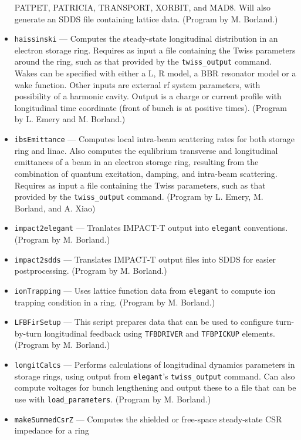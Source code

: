 \documentclass[11pt]{article}
\begin{document}
\begin{itemize}
        PATPET, PATRICIA, TRANSPORT, XORBIT, and MAD8.  Will also generate an SDDS file containing lattice
        data.  (Program by M. Borland.)
\item {\tt haissinski} --- Computes the steady-state longitudinal distribution in
        an electron storage ring.  Requires as input a file containing the Twiss
        parameters around the ring, such as that provided by the \verb|twiss_output| command.
        Wakes can be specified with either a L, R model, a BBR resonator model or a wake function.
        Other inputs are external rf system parameters, with possibility of a harmonic
        cavity. Output is a charge or current profile with longitudinal time coordinate (front
        of bunch is at positive times). 
        (Program by L. Emery and M. Borland.)
\item {\tt ibsEmittance} --- Computes local intra-beam scattering rates for both storage ring
        and linac. Also computes the equlibrium transverse and longitudinal emittances of a 
        beam in an electron storage ring, resulting from the combination of quantum excitation,
        damping, and intra-beam scattering.  Requires as input a file containing the
        Twiss parameters, such as that provided by the \verb|twiss_output| command.
        (Program by L. Emery, M. Borland, and A. Xiao)
\item {\tt impact2elegant} --- Tranlates IMPACT-T \cite{IMPACT} output into {\tt elegant} conventions.
  (Program by M. Borland.)
\item {\tt impact2sdds} --- Translates IMPACT-T output files into SDDS for easier postprocessing.
  (Program by M. Borland.)
\item {\tt ionTrapping} --- Uses lattice function data from {\tt elegant} to compute ion trapping condition in
  a ring. (Program by M. Borland.)
\item {\tt LFBFirSetup} --- This script prepares data that can be used to configure turn-by-turn longitudinal feedback using
  \verb|TFBDRIVER| and \verb|TFBPICKUP| elements.
  (Program by M. Borland.)
\item {\tt longitCalcs} --- Performs calculations of longitudinal dynamics parameters in storage rings,
  using output from \verb|elegant|'s \verb|twiss_output| command. Can also compute voltages for
  bunch lengthening and output these to a file that can be use with \verb|load_parameters|.
  (Program by M. Borland.)
\item {\tt makeSummedCsrZ} --- Computes the shielded or free-space steady-state CSR impedance for a ring

\end{itemize}
\end{document}
